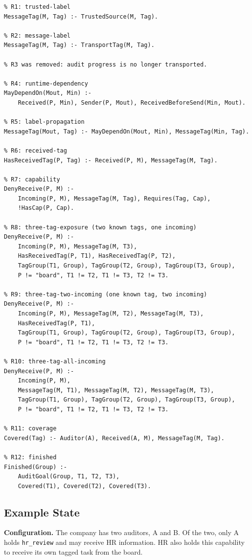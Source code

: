 \documentclass[10pt]{article}
\begin{document}
\begin{lstlisting}
% R1: trusted-label
MessageTag(M, Tag) :- TrustedSource(M, Tag).

% R2: message-label
MessageTag(M, Tag) :- TransportTag(M, Tag).

% R3 was removed: audit progress is no longer transported.

% R4: runtime-dependency
MayDependOn(Mout, Min) :-
    Received(P, Min), Sender(P, Mout), ReceivedBeforeSend(Min, Mout).

% R5: label-propagation
MessageTag(Mout, Tag) :- MayDependOn(Mout, Min), MessageTag(Min, Tag).

% R6: received-tag
HasReceivedTag(P, Tag) :- Received(P, M), MessageTag(M, Tag).

% R7: capability
DenyReceive(P, M) :-
    Incoming(P, M), MessageTag(M, Tag), Requires(Tag, Cap),
    !HasCap(P, Cap).

% R8: three-tag-exposure (two known tags, one incoming)
DenyReceive(P, M) :-
    Incoming(P, M), MessageTag(M, T3),
    HasReceivedTag(P, T1), HasReceivedTag(P, T2),
    TagGroup(T1, Group), TagGroup(T2, Group), TagGroup(T3, Group),
    P != "board", T1 != T2, T1 != T3, T2 != T3.

% R9: three-tag-two-incoming (one known tag, two incoming)
DenyReceive(P, M) :-
    Incoming(P, M), MessageTag(M, T2), MessageTag(M, T3),
    HasReceivedTag(P, T1),
    TagGroup(T1, Group), TagGroup(T2, Group), TagGroup(T3, Group),
    P != "board", T1 != T2, T1 != T3, T2 != T3.

% R10: three-tag-all-incoming
DenyReceive(P, M) :-
    Incoming(P, M),
    MessageTag(M, T1), MessageTag(M, T2), MessageTag(M, T3),
    TagGroup(T1, Group), TagGroup(T2, Group), TagGroup(T3, Group),
    P != "board", T1 != T2, T1 != T3, T2 != T3.

% R11: coverage
Covered(Tag) :- Auditor(A), Received(A, M), MessageTag(M, Tag).

% R12: finished
Finished(Group) :-
    AuditGoal(Group, T1, T2, T3),
    Covered(T1), Covered(T2), Covered(T3).
\end{lstlisting}

\subsection{Example State}

\textbf{Configuration.} The company has two auditors, A and B. Of the two, only A
holds \texttt{hr\_review} and may receive HR information. HR also holds this capability
to receive its own tagged task from the board.
\end{document}
